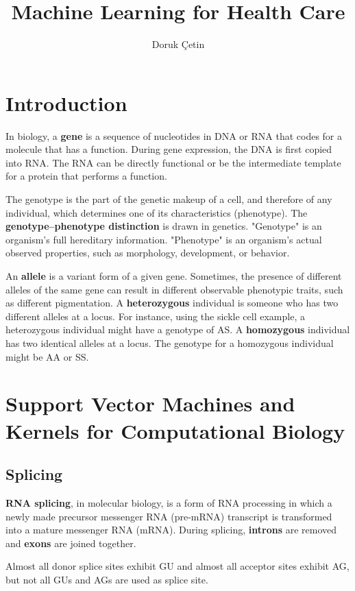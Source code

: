\documentclass[12pt]{article}
\begin{document}
\rhead{\today}

\title{Machine Learning for Health Care}
\author{Doruk Çetin}
\maketitle

\setcounter{tocdepth}{1}
\tableofcontents
\pagebreak

\section{Introduction}
\par In biology, a \textbf{gene} is a sequence of nucleotides in DNA or RNA that codes for a molecule that has a function. During gene expression, the DNA is first copied into RNA. The RNA can be directly functional or be the intermediate template for a protein that performs a function.
\par The genotype is the part of the genetic makeup of a cell, and therefore of any individual, which determines one of its characteristics (phenotype). The \textbf{genotype–phenotype distinction} is drawn in genetics. "Genotype" is an organism's full hereditary information. "Phenotype" is an organism's actual observed properties, such as morphology, development, or behavior.
\par An \textbf{allele} is a variant form of a given gene. Sometimes, the presence of different alleles of the same gene can result in different observable phenotypic traits, such as different pigmentation. A \textbf{heterozygous} individual is someone who has two different alleles at a locus. For instance, using the sickle cell example, a heterozygous individual might have a genotype of AS. A \textbf{homozygous} individual has two identical alleles at a locus. The genotype for a homozygous individual might be AA or SS.

\section{Support Vector Machines and Kernels for Computational Biology}

\subsection{Splicing}
\par \textbf{RNA splicing}, in molecular biology, is a form of RNA processing in which a newly made precursor messenger RNA (pre-mRNA) transcript is transformed into a mature messenger RNA (mRNA). During splicing, \textbf{introns} are removed and \textbf{exons} are joined together.
\par Almost all donor splice sites exhibit GU and almost all acceptor sites exhibit AG, but not all GUs and AGs are used as splice site.
\end{document}
